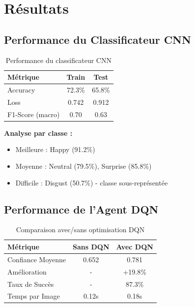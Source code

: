 \documentclass[12pt,a4paper]{article}
\begin{document}
\newpage

\section{Résultats}

\subsection{Performance du Classificateur CNN}

\begin{table}[H]
\centering
\begin{tabular}{@{}lcc@{}}
\toprule
\textbf{Métrique} & \textbf{Train} & \textbf{Test} \\ \midrule
Accuracy & 72.3\% & 65.8\% \\
Loss & 0.742 & 0.912 \\
F1-Score (macro) & 0.70 & 0.63 \\ \bottomrule
\end{tabular}
\caption{Performance du classificateur CNN}
\end{table}

\textbf{Analyse par classe :}
\begin{itemize}
    \item Meilleure : Happy (91.2\%)
    \item Moyenne : Neutral (79.5\%), Surprise (85.8\%)
    \item Difficile : Disgust (50.7\%) - classe sous-représentée
\end{itemize}

\subsection{Performance de l'Agent DQN}

\begin{table}[H]
\centering
\begin{tabular}{@{}lcc@{}}
\toprule
\textbf{Métrique} & \textbf{Sans DQN} & \textbf{Avec DQN} \\ \midrule
Confiance Moyenne & 0.652 & 0.781 \\
Amélioration & - & +19.8\% \\
Taux de Succès & - & 87.3\% \\
Temps par Image & 0.12s & 0.18s \\ \bottomrule
\end{tabular}
\caption{Comparaison avec/sans optimisation DQN}
\end{table}
\end{document}

